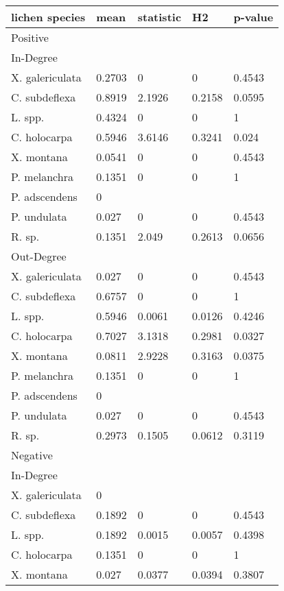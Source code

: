 \begin{table}[ht]
\centering
\begin{tabular}{lllll}
  \hline
lichen species & mean & statistic & H2 & p-value \\ 
  \hline
Positive &  &  &  &  \\ 
  In-Degree &  &  &  &  \\ 
  X. galericulata & 0.2703 & 0 & 0 & 0.4543 \\ 
  C. subdeflexa & 0.8919 & 2.1926 & 0.2158 & 0.0595 \\ 
  L. spp. & 0.4324 & 0 & 0 & 1 \\ 
  C. holocarpa & 0.5946 & 3.6146 & 0.3241 & 0.024 \\ 
  X. montana & 0.0541 & 0 & 0 & 0.4543 \\ 
  P. melanchra & 0.1351 & 0 & 0 & 1 \\ 
  P. adscendens & 0 &  &  &  \\ 
  P. undulata & 0.027 & 0 & 0 & 0.4543 \\ 
  R. sp. & 0.1351 & 2.049 & 0.2613 & 0.0656 \\ 
  Out-Degree &  &  &  &  \\ 
  X. galericulata & 0.027 & 0 & 0 & 0.4543 \\ 
  C. subdeflexa & 0.6757 & 0 & 0 & 1 \\ 
  L. spp. & 0.5946 & 0.0061 & 0.0126 & 0.4246 \\ 
  C. holocarpa & 0.7027 & 3.1318 & 0.2981 & 0.0327 \\ 
  X. montana & 0.0811 & 2.9228 & 0.3163 & 0.0375 \\ 
  P. melanchra & 0.1351 & 0 & 0 & 1 \\ 
  P. adscendens & 0 &  &  &  \\ 
  P. undulata & 0.027 & 0 & 0 & 0.4543 \\ 
  R. sp. & 0.2973 & 0.1505 & 0.0612 & 0.3119 \\ 
  Negative &  &  &  &  \\ 
  In-Degree &  &  &  &  \\ 
  X. galericulata & 0 &  &  &  \\ 
  C. subdeflexa & 0.1892 & 0 & 0 & 0.4543 \\ 
  L. spp. & 0.1892 & 0.0015 & 0.0057 & 0.4398 \\ 
  C. holocarpa & 0.1351 & 0 & 0 & 1 \\ 
  X. montana & 0.027 & 0.0377 & 0.0394 & 0.3807 \\ 

\end{tabular}
\end{table}
